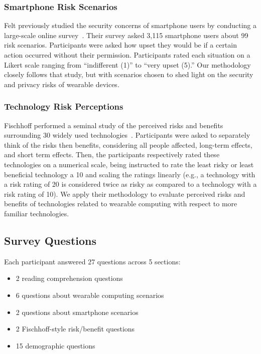 \subsubsection{Smartphone Risk Scenarios}
Felt \etal previously studied the security concerns of smartphone users by conducting a large-scale online survey~\cite{Felt}. Their survey asked 3,115 smartphone users about 99 risk scenarios. Participants were asked how upset they would be if a certain action occurred without their permission. Participants rated each situation on a Likert scale ranging from ``indifferent (1)'' to ``very upset (5).''
Our methodology closely follows that study, but with scenarios chosen to shed light on the security and privacy risks of wearable devices.

\subsubsection{Technology Risk Perceptions}
Fischhoff \etal performed a seminal study of the perceived risks and benefits surrounding 30 widely used technologies~\cite{Fischhoff}. Participants were asked to separately think of the risks then benefits, considering all people affected, long-term effects, and short term effects. Then, the participants respectively rated these technologies on a numerical scale, being instructed to rate the least risky or least beneficial technology a 10 and scaling the ratings linearly (e.g., a technology with a risk rating of 20 is considered twice as risky as compared to a technology with a risk rating of 10). We apply their methodology to evaluate perceived risks and benefits of technologies related to wearable computing with respect to more familiar technologies.

\subsection{Survey Questions}
\noindent Each participant answered 27 questions across 5 sections:   \\[-.5cm]

\begin{itemize} \itemsep1pt \parskip0pt 
\item 2 reading comprehension questions
\item 6 questions about wearable computing scenarios 
\item 2 questions about smartphone scenarios 
\item 2 Fischhoff-style risk/benefit questions 
\item 15 demographic questions %
\end{itemize}

